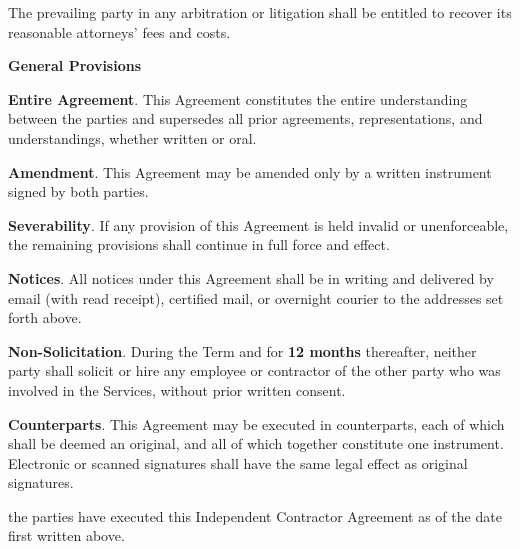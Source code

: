 \documentclass[10pt]{article}
\newcounter{artcnt}
\newcommand{\article}[1]{%
  \stepcounter{artcnt}%
  \vspace{11pt}%
  \noindent\makebox[22pt][l]{{\color{accent}\bfseries\Large\theartcnt.}}%
  {\color{accent}\bfseries\large#1}%
  \vspace{3pt}\par%
}
\newcommand{\cl}[1]{%
  \par\vspace{2pt}\noindent{\color{accent}\bfseries(#1)}\enspace%
}
\begin{document}
\cl{c} The prevailing party in any arbitration or litigation shall be entitled to recover its reasonable attorneys' fees and costs.

\article{General Provisions}

\cl{a} \textbf{Entire Agreement}. This Agreement constitutes the entire understanding between the parties and supersedes all prior agreements, representations, and understandings, whether written or oral.

\cl{b} \textbf{Amendment}. This Agreement may be amended only by a written instrument signed by both parties.

\cl{c} \textbf{Severability}. If any provision of this Agreement is held invalid or unenforceable, the remaining provisions shall continue in full force and effect.

\cl{d} \textbf{Notices}. All notices under this Agreement shall be in writing and delivered by email (with read receipt), certified mail, or overnight courier to the addresses set forth above.

\cl{e} \textbf{Non-Solicitation}. During the Term and for \textbf{12 months} thereafter, neither party shall solicit or hire any employee or contractor of the other party who was involved in the Services, without prior written consent.

\cl{f} \textbf{Counterparts}. This Agreement may be executed in counterparts, each of which shall be deemed an original, and all of which together constitute one instrument. Electronic or scanned signatures shall have the same legal effect as original signatures.

\vspace{18pt}
\noindent{\color{accent}\rule{\linewidth}{1.2pt}}
\vspace{6pt}
 the parties have executed this Independent Contractor Agreement as of the date first written above.
\end{document}
